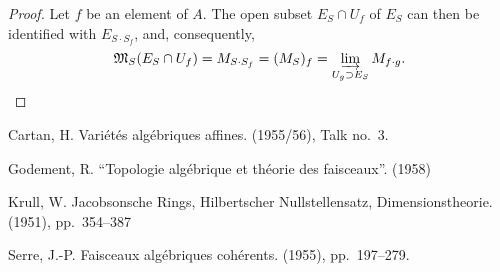 \documentclass{article}
\theoremstyle{plain}
\newcommand{\sh}{\mathfrak}
\begin{document}
\begin{proof}
  Let $f$ be an element of $A$.
  The open subset $E_S\cap U_f$ of $E_S$ can then be identified with $E_{S\cdot S_f}$, and, consequently,
  \[
    \sh{M}_S(E_S\cap U_f)
    = M_{S\cdot S_f}
    = (M_S)_f
    = \varinjlim_{U_g\supset E_S}M_{f\cdot g}.
  \]
\end{proof}



\nocite{*}

\begin{thebibliography}{10}

  {\sc Cartan, H.}
  \newblock Vari\'{e}t\'{e}s alg\'{e}briques affines.
   (1955/56), Talk no.~3.

  {\sc Godement, R.}
  \newblock ``Topologie alg\'{e}brique et th\'{e}orie des faisceaux''.
   (1958)

  {\sc Krull, W.}
  \newblock Jacobsonsche Rings, Hilbertscher Nullstellensatz, Dimensionstheorie.
   (1951), pp.~354--387

  {\sc Serre, J.-P.}
  \newblock Faisceaux alg\'{e}briques coh\'{e}rents.
   (1955), pp.~197--279.

\end{thebibliography}
\end{document}
